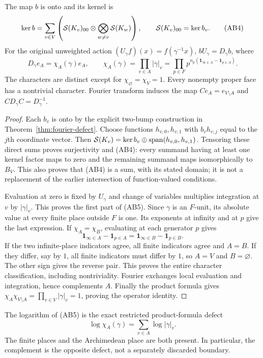 \begin{theorem}\label{thm:boundary-characters}
The map $b$ is onto and its kernel is
\[
 \ker b=\sum_{v\in V}
 \left(\mathcal S(K_v)_{00}\otimes\bigotimes_{w\ne v}\mathcal S(K_w)\right),
 \qquad \mathcal S(K_v)_{00}=\ker b_v.
 \tag{AB4}
\]
For the original unweighted action $(U_\gamma f)(x)=f(\gamma^{-1}x)$,
$bU_\gamma=D_\gamma b$, where
\[
 D_\gamma e_A=\chi_A(\gamma)e_A,\qquad
 \chi_A(\gamma)=\prod_{v\in A}|\gamma|_v
 =\prod_{p\in F}p^{n_p(\mathbf1_{\infty\in A}-\mathbf1_{p\in A})}.
 \tag{AB5}
\]
The characters are distinct except for
$\chi_\varnothing=\chi_V=1$. Every nonempty proper face has a nontrivial
character. Fourier transform induces the map $C e_A=e_{V\setminus A}$ and
$C D_\gamma C=D_\gamma^{-1}$.
\end{theorem}
\begin{proof}
Each $b_v$ is onto by the explicit two-bump construction in
Theorem~\ref{thm:fourier-defect}. Choose functions $h_{v,0},h_{v,1}$ with
$b_vh_{v,j}$ equal to the $j$th coordinate vector. Then
$\mathcal S(K_v)=\ker b_v\oplus\operatorname{span}(h_{v,0},h_{v,1})$.
Tensoring these direct sums proves surjectivity and (AB4): every summand
having at least one kernel factor maps to zero and the remaining summand maps
isomorphically to $B_V$. This also proves that (AB4) is a sum, with its stated
domain; it is not a replacement of the earlier intersection of function-valued
conditions.

Evaluation at zero is fixed by $U_\gamma$ and change of variables multiplies
integration at $v$ by $|\gamma|_v$. This proves the first part of (AB5).
Since $\gamma$ is an $F$-unit, its absolute value at every finite place outside
$F$ is one. Its exponents at infinity and at $p$ give the last expression.
If $\chi_A=\chi_B$, evaluating at each generator $p$ gives
\[
 \mathbf1_{\infty\in A}-\mathbf1_{p\in A}
 =\mathbf1_{\infty\in B}-\mathbf1_{p\in B}.
 \tag{AB6}
\]
If the two infinite-place indicators agree, all finite indicators agree and
$A=B$. If they differ, say by $1$, all finite indicators must differ by $1$,
so $A=V$ and $B=\varnothing$. The other sign gives the reverse pair.
This proves the entire character classification, including nontriviality.
Fourier exchanges local evaluation and integration, hence complements $A$.
Finally the product formula gives
$\chi_A\chi_{V\setminus A}=\prod_{v\in V}|\gamma|_v=1$,
proving the operator identity.
\end{proof}

The logarithm of (AB5) is the exact restricted product-formula defect
\[
 \log\chi_A(\gamma)=\sum_{v\in A}\log|\gamma|_v.
 \tag{AB7}
\]
The finite places and the Archimedean place are both present. In particular,
the complement is the opposite defect, not a separately discarded boundary.

